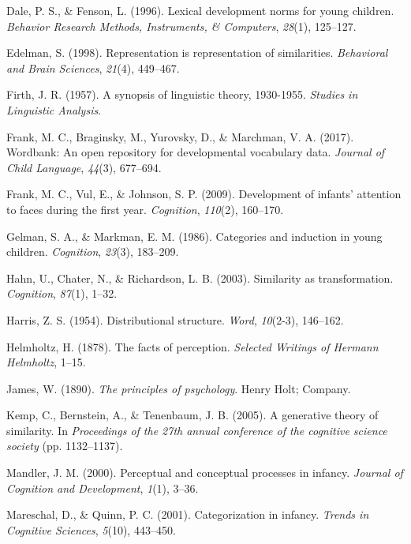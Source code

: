 \documentclass[10pt, letterpaper]{article}
\begin{document}
\hypertarget{ref-dale1996lexical}{}
Dale, P. S., \& Fenson, L. (1996). Lexical development norms for young
children. \emph{Behavior Research Methods, Instruments, \& Computers},
\emph{28}(1), 125--127.

\hypertarget{ref-edelman1998representation}{}
Edelman, S. (1998). Representation is representation of similarities.
\emph{Behavioral and Brain Sciences}, \emph{21}(4), 449--467.

\hypertarget{ref-firth1957synopsis}{}
Firth, J. R. (1957). A synopsis of linguistic theory, 1930-1955.
\emph{Studies in Linguistic Analysis}.

\hypertarget{ref-frank2017wordbank}{}
Frank, M. C., Braginsky, M., Yurovsky, D., \& Marchman, V. A. (2017).
Wordbank: An open repository for developmental vocabulary data.
\emph{Journal of Child Language}, \emph{44}(3), 677--694.

\hypertarget{ref-frank2009development}{}
Frank, M. C., Vul, E., \& Johnson, S. P. (2009). Development of infants'
attention to faces during the first year. \emph{Cognition},
\emph{110}(2), 160--170.

\hypertarget{ref-gelman1986categories}{}
Gelman, S. A., \& Markman, E. M. (1986). Categories and induction in
young children. \emph{Cognition}, \emph{23}(3), 183--209.

\hypertarget{ref-hahn2003similarity}{}
Hahn, U., Chater, N., \& Richardson, L. B. (2003). Similarity as
transformation. \emph{Cognition}, \emph{87}(1), 1--32.

\hypertarget{ref-harris1954distributional}{}
Harris, Z. S. (1954). Distributional structure. \emph{Word},
\emph{10}(2-3), 146--162.

\hypertarget{ref-helmholtz1878facts}{}
Helmholtz, H. (1878). The facts of perception. \emph{Selected Writings
of Hermann Helmholtz}, 1--15.

\hypertarget{ref-james2013principles}{}
James, W. (1890). \emph{The principles of psychology}. Henry Holt;
Company.

\hypertarget{ref-kemp2005generative}{}
Kemp, C., Bernstein, A., \& Tenenbaum, J. B. (2005). A generative theory
of similarity. In \emph{Proceedings of the 27th annual conference of the
cognitive science society} (pp. 1132--1137).

\hypertarget{ref-mandler2000perceptual}{}
Mandler, J. M. (2000). Perceptual and conceptual processes in infancy.
\emph{Journal of Cognition and Development}, \emph{1}(1), 3--36.

\hypertarget{ref-mareschal2001categorization}{}
Mareschal, D., \& Quinn, P. C. (2001). Categorization in infancy.
\emph{Trends in Cognitive Sciences}, \emph{5}(10), 443--450.
\end{document}
